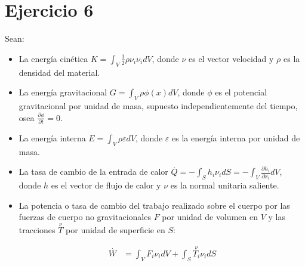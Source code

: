 \documentclass[a4paper,10pt,twoside,final,spanish]{article}
\begin{document}
\section*{Ejercicio 6}

Sean:

\begin{itemize}
\item La energía cinética $\displaystyle K=\int_{V}\frac{1}{2}\rho\nu_{i}\nu_{i}dV$, donde $\nu$ es el vector velocidad y $\rho$ es la densidad del material.

\item La energía gravitacional $\displaystyle G=\int_{V}\rho\phi(x)dV$, donde $\phi$ es el potencial gravitacional por unidad de masa, supuesto independientemente del tiempo, osea $\displaystyle \frac{\partial\phi}{\partial t}=0$.

\item La energía interna $\displaystyle E=\int_{V}\rho\varepsilon dV$, donde $\varepsilon$ es la energía interna por unidad de masa.

\item La tasa de cambio de la entrada de calor $\displaystyle \stackrel{\cdot}{Q}=-\int_{S}h_{i}\nu_{i}dS=-\int_{V}\frac{\partial h_{i}}{\partial x_{i}}dV$, donde $h$ es el vector de flujo de calor y $\nu$ es la normal unitaria saliente.

\item La potencia o tasa de cambio del trabajo realizado sobre el cuerpo por las fuerzas de cuerpo no gravitacionales $F$ por unidad de volumen en $V$ y las tracciones $\stackrel{\nu}{T}$ por unidad de superficie en $S$:

\begin{align*}
\stackrel{\cdot}{W} &= \int_{V}F_{i}\nu_{i}dV+\int_{S}\stackrel{\nu}{T_{i}}\nu_{i}dS
\end{align*}
  
\end{itemize}  
  
\end{document}
